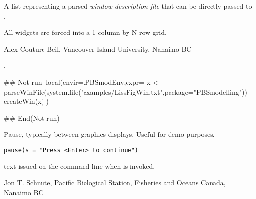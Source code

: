 \documentclass[letterpaper]{book}
\begin{document}
%
\begin{Value}
A list representing a parsed \emph{window description file} that can be directly 
passed to .
\end{Value}
%
\begin{Note}\relax
All widgets are forced into a 1-column by N-row grid.
\end{Note}
%
\begin{Author}\relax
Alex Couture-Beil, Vancouver Island University, Nanaimo BC
\end{Author}
%
\begin{SeeAlso}\relax
{}, 
\end{SeeAlso}
%
\begin{Examples}
\begin{ExampleCode}
## Not run: 
local(envir=.PBSmodEnv,expr={
  x <- parseWinFile(system.file("examples/LissFigWin.txt",package="PBSmodelling"))
  createWin(x)
})

## End(Not run)
\end{ExampleCode}
\end{Examples}
%
\begin{Description}\relax
Pause, typically between graphics displays. Useful for demo purposes.
\end{Description}
%
\begin{Usage}
\begin{verbatim}
pause(s = "Press <Enter> to continue")
\end{verbatim}
\end{Usage}
%
\begin{Arguments}
\begin{ldescription}
\item[\code{s}] text issued on the command line when  is invoked.
\end{ldescription}
\end{Arguments}
%
\begin{Author}\relax
Jon T. Schnute, Pacific Biological Station, Fisheries and Oceans Canada, Nanaimo BC
\end{Author}
%
\end{document}
